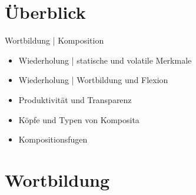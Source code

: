 \section{Überblick}

\begin{frame}
  {Wortbildung | Komposition}
  \onslide<+->
  \begin{itemize}[<+->]
    \item Wiederholung | statische und volatile Merkmale
    \item Wiederholung | Wortbildung und Flexion
      \Zeile
    \item Produktivität und Transparenz
    \item Köpfe und Typen von Komposita
    \item Kompositionsfugen
  \end{itemize}
\end{frame}

\section{Wortbildung}


